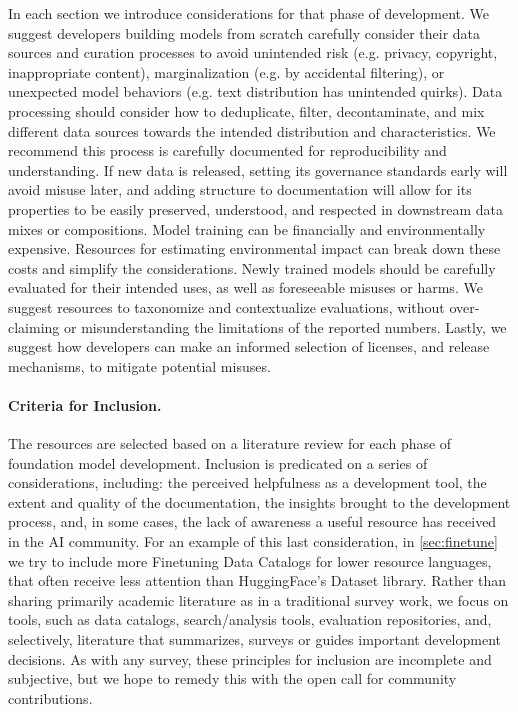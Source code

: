 In each section we introduce considerations for that phase of development.
We suggest developers building models from scratch carefully consider their data sources and curation processes to avoid unintended risk (e.g. privacy, copyright, inappropriate content), marginalization (e.g. by accidental filtering), or unexpected model behaviors (e.g. text distribution has unintended quirks). 
Data processing should consider how to deduplicate, filter, decontaminate, and mix different data sources towards the intended distribution and characteristics.
We recommend this process is carefully documented for reproducibility and understanding.
If new data is released, setting its governance standards early will avoid misuse later, and adding structure to documentation will allow for its properties to be easily preserved, understood, and respected in downstream data mixes or compositions.
Model training can be financially and environmentally expensive.
Resources for estimating environmental impact can break down these costs and simplify the considerations.
Newly trained models should be carefully evaluated for their intended uses, as well as foreseeable misuses or harms.
We suggest resources to taxonomize and contextualize evaluations, without over-claiming or misunderstanding the limitations of the reported numbers.
Lastly, we suggest how developers can make an informed selection of licenses, and release mechanisms, to mitigate potential misuses.


\paragraph{Criteria for Inclusion.}
\label{sec:criteria}
The resources are selected based on a literature review for each phase of foundation model development. Inclusion is predicated on a series of considerations, including: the perceived helpfulness as a development tool, the extent and quality of the documentation, the insights brought to the development process, and, in some cases, the lack of awareness a useful resource has received in the AI community.
For an example of this last consideration, in \cref{sec:finetune} we try to include more Finetuning Data Catalogs for lower resource languages, that often receive less attention than HuggingFace's Dataset library.
Rather than sharing primarily academic literature as in a traditional survey work, we focus on tools, such as data catalogs, search/analysis tools, evaluation repositories, and, selectively, literature that summarizes, surveys or guides important development decisions.
As with any survey, these principles for inclusion are incomplete and subjective, but we hope to remedy this with the open call for community contributions.

